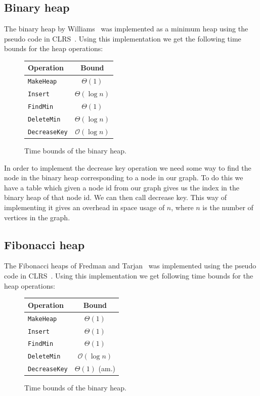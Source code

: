 \documentclass[a4paper,oneside,article,11pt]{memoir}
\begin{document}
\subsection{Binary heap}
The binary heap by Williams~\cite{williams} was implemented as a minimum heap using the pseudo code in CLRS~\cite[p.~151-170]{clrs}. Using this implementation we get the following time bounds for the heap operations:

\begin{figure}[H]
\centering
\begin{tabular}{l|c}
Operation & Bound \\\hline
\texttt{MakeHeap} & $\Theta(1)$ \\\hline
\texttt{Insert} & $\Theta(\log n)$ \\\hline
\texttt{FindMin} & $\Theta(1)$ \\\hline
\texttt{DeleteMin} & $\Theta(\log n)$ \\\hline
\texttt{DecreaseKey} & $\mathcal{O}(\log n)$
\end{tabular}
\caption{Time bounds of the binary heap.}
\end{figure}

In order to implement the decrease key operation we need some way to find the node in the binary heap corresponding to a node in our graph. To do this we have a table which given a node id from our graph gives us the index in the binary heap of that node id. We can then call decrease key. This way of implementing it gives an overhead in space usage of $n$, where $n$ is the number of vertices in the graph.

\subsection{Fibonacci heap}

The Fibonacci heaps of Fredman and Tarjan~\cite{fred87} was implemented using the pseudo code in CLRS~\cite[p.~505-522]{clrs}. Using this implementation we get following time bounds for the heap operations:

\begin{figure}[H]
\centering
\begin{tabular}{l|c}
Operation & Bound \\\hline
\texttt{MakeHeap} & $\Theta(1)$ \\\hline
\texttt{Insert} & $\Theta(1)$ \\\hline
\texttt{FindMin} & $\Theta(1)$ \\\hline
\texttt{DeleteMin} & $\mathcal{O}(\log n)$ \\\hline
\texttt{DecreaseKey} & $\Theta(1)$ (am.)
\end{tabular}
\caption{Time bounds of the binary heap.}
\end{figure}
\end{document}
